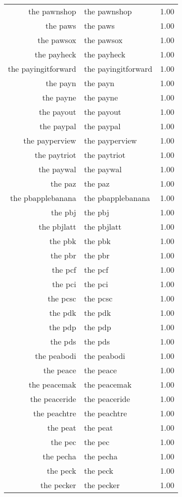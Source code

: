 \begin{table}[ht]
\begin{tabular}{rlr}
  the pawnshop & the pawnshop & 1.00 \\ 
  the paws & the paws & 1.00 \\ 
  the pawsox & the pawsox & 1.00 \\ 
  the payheck & the payheck & 1.00 \\ 
  the payingitforward & the payingitforward & 1.00 \\ 
  the payn & the payn & 1.00 \\ 
  the payne & the payne & 1.00 \\ 
  the payout & the payout & 1.00 \\ 
  the paypal & the paypal & 1.00 \\ 
  the payperview & the payperview & 1.00 \\ 
  the paytriot & the paytriot & 1.00 \\ 
  the paywal & the paywal & 1.00 \\ 
  the paz & the paz & 1.00 \\ 
  the pbapplebanana & the pbapplebanana & 1.00 \\ 
  the pbj & the pbj & 1.00 \\ 
  the pbjlatt & the pbjlatt & 1.00 \\ 
  the pbk & the pbk & 1.00 \\ 
  the pbr & the pbr & 1.00 \\ 
  the pcf & the pcf & 1.00 \\ 
  the pci & the pci & 1.00 \\ 
  the pcsc & the pcsc & 1.00 \\ 
  the pdk & the pdk & 1.00 \\ 
  the pdp & the pdp & 1.00 \\ 
  the pds & the pds & 1.00 \\ 
  the peabodi & the peabodi & 1.00 \\ 
  the peace & the peace & 1.00 \\ 
  the peacemak & the peacemak & 1.00 \\ 
  the peaceride & the peaceride & 1.00 \\ 
  the peachtre & the peachtre & 1.00 \\ 
  the peat & the peat & 1.00 \\ 
  the pec & the pec & 1.00 \\ 
  the pecha & the pecha & 1.00 \\ 
  the peck & the peck & 1.00 \\ 
  the pecker & the pecker & 1.00 \\ 

\end{tabular}
\end{table}
